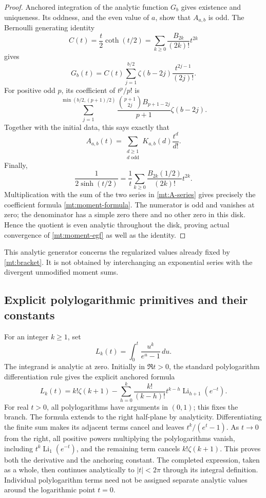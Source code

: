 \documentclass[11pt,letterpaper]{article}
\numberwithin{equation}{section}
\theoremstyle{plain}
\theoremstyle{definition}
\theoremstyle{remark}
\begin{document}
\begin{proof}
Anchored integration of the analytic function $G_b$ gives existence
and uniqueness. Its oddness, and the even value of $a$, show that
$A_{a,b}$ is odd. The Bernoulli generating identity
\[
 C(t)=\frac t2\coth(t/2)
       =\sum_{k\ge0}\frac{B_{2k}}{(2k)!}t^{2k}
\]
gives
\[
 G_b(t)=C(t)\sum_{j=1}^{b/2}\zeta(b-2j)\frac{t^{2j-1}}{(2j)!}.
\]
For positive odd $p$, its coefficient of $t^p/p!$ is
\[
 \sum_{j=1}^{\min(b/2,(p+1)/2)}
   \frac{\binom{p+1}{2j}B_{p+1-2j}}{p+1}\zeta(b-2j).
\]
Together with the initial data, this says exactly that
\begin{equation}\label{mt:A-series}
 A_{a,b}(t)=\sum_{\substack{d\ge1\\d\text{ odd}}}
                             K_{a,b}(d)\frac{t^d}{d!}.
\end{equation}
Finally,
\[
 \frac1{2\sinh(t/2)}
     =\frac1t\sum_{k\ge0}\frac{B_{2k}(1/2)}{(2k)!}t^{2k}.
\]
Multiplication with the sum of the two series in
\eqref{mt:A-series} gives precisely the coefficient formula
\eqref{mt:moment-formula}. The numerator is odd and vanishes at zero;
the denominator has a simple zero there and no other zero in this
disk. Hence the quotient is even analytic throughout the disk, proving
actual convergence of \eqref{mt:moment-egf} as well as the identity.
\end{proof}

This analytic generator concerns the regularized values already fixed
by \eqref{mt:bracket}. It is not obtained by interchanging an exponential
series with the divergent unmodified moment sums.

\subsection{Explicit polylogarithmic primitives and their constants}

For an integer $k\ge1$, set
\begin{equation}\label{mt:L-integral}
 L_k(t)=\int_0^t\frac{u^k}{e^u-1}\,du.
\end{equation}
The integrand is analytic at zero. Initially in $\Re t>0$, the standard
polylogarithm differentiation rule \cite[\S25.12]{DLMFPolylog} gives the explicit anchored formula
\begin{equation}\label{mt:L-polylog}
 L_k(t)=k!\zeta(k+1)
 -\sum_{h=0}^k\frac{k!}{(k-h)!}
                      t^{k-h}\operatorname{Li}_{h+1}(e^{-t}).
\end{equation}
For real $t>0$, all polylogarithms have arguments in $(0,1)$; this fixes
the branch. The formula extends to the right half-plane by analyticity.
Differentiating the finite sum makes its adjacent terms cancel and
leaves $t^k/(e^t-1)$. As $t\to0$ from the right, all positive powers
multiplying the polylogarithms vanish, including
$t^k\operatorname{Li}_1(e^{-t})$, and the remaining term cancels
$k!\zeta(k+1)$. This proves both the derivative and the anchoring
constant. The completed expression, taken as a whole, then continues
analytically to $|t|<2\pi$ through its integral definition. Individual
polylogarithm terms need not be assigned separate analytic values
around the logarithmic point $t=0$.
\end{document}
